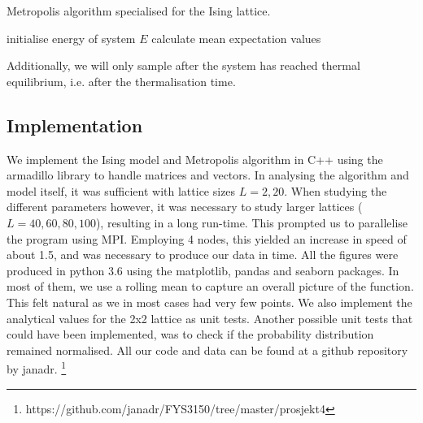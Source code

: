 	\begin{algorithm}[htbp]
	\label{algo:metro}
	\caption{Metropolis algorithm specialised for the Ising lattice.}
		\SetAlgoLined
		\BlankLine
		\BlankLine
		initialise energy of system $E$\;
		calculate mean expectation values\;	
		\BlankLine
		\BlankLine
	\end{algorithm}

Additionally, we will only sample after the system has reached thermal equilibrium, i.e. after the thermalisation time.

\subsection{Implementation}
\label{sec:implementation}

We implement the Ising model and Metropolis algorithm in C++ using the armadillo library to handle matrices and vectors. In analysing the algorithm and model itself, it was sufficient with lattice sizes $L=2, 20$. When studying the different parameters however, it was necessary to study larger lattices ($L = 40, 60, 80, 100$), resulting in a long run-time. This prompted us to parallelise the program using MPI. Employing 4 nodes, this yielded an increase in speed of about 1.5, and was necessary to produce our data in time.
All the figures were produced in python 3.6 using the matplotlib, pandas and seaborn packages. In most of them, we use a rolling mean to capture an overall picture of the function. This felt natural as we in most cases had very few points. We also implement the analytical values for the 2x2 lattice as unit tests. Another possible unit tests that could have been implemented, was to check if the probability distribution remained normalised. All our code and data can be found at a github repository by janadr. \footnote{https://github.com/janadr/FYS3150/tree/master/prosjekt4}

